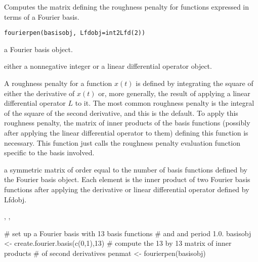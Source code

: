 \documentclass{article}
\begin{document}
\begin{Description}\relax
Computes the matrix defining the roughness penalty for functions
expressed in terms of a Fourier basis.
\end{Description}
\begin{Usage}
\begin{verbatim}
fourierpen(basisobj, Lfdobj=int2Lfd(2))
\end{verbatim}
\end{Usage}
\begin{Arguments}
\begin{ldescription}
\item[\code{basisobj}] a Fourier basis object.

\item[\code{Lfdobj}] either a nonnegative integer or a linear differential operator object.

\end{ldescription}
\end{Arguments}
\begin{Details}\relax
A roughness penalty for a function $x(t)$ is defined by
integrating the square of either the derivative of  $ x(t) $ or,
more generally, the result of applying a linear differential operator
$L$ to it.  The most common roughness penalty is the integral of
the square of the second derivative, and
this is the default. To apply this roughness penalty, the matrix of
inner products of the basis functions (possibly after applying the
linear differential operator to them) defining this function
is necessary. This function just calls the roughness penalty evaluation
function specific to the basis involved.
\end{Details}
\begin{Value}
a symmetric matrix of order equal to the number of basis functions
defined by the Fourier basis object.  Each element is the inner product
of two Fourier basis functions after applying the derivative or linear
differential operator defined by Lfdobj.
\end{Value}
\begin{SeeAlso}\relax
{}, 
, 
\end{SeeAlso}
\begin{Examples}
\begin{ExampleCode}

#  set up a Fourier basis with 13 basis functions
#  and and period 1.0.
basisobj <- create.fourier.basis(c(0,1),13)
#  compute the 13 by 13 matrix of inner products
#  of second derivatives
penmat <- fourierpen(basisobj)

\end{ExampleCode}
\end{Examples}
\end{document}
